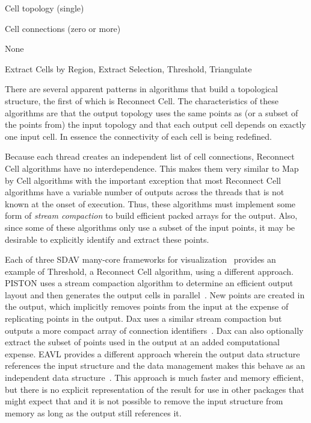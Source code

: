 \documentclass{sig-alternate}
\newcommand*{\lcite}[1]{~\cite{#1}}
\newcommand*{\keyterm}[1]{\emph{#1}}
\newcommand{\algclass}[1]{\textsf{#1}}
\newcommand{\alg}[1]{#1}
\newcommand{\algorithmclasssection}[1]{
  \vspace{\baselineskip}\noindent{\large\textbf{\algclass{#1}}}}
\newcommand{\algorithmclass}[5]{
  \algorithmclasssection{#1} %
  \vspace{-.4\baselineskip}
  \begin{description}[leftmargin=9em,style=nextline,noitemsep]
    \raggedright
  \item[Input] #2
  \item[Output] #3
  \item[Interdependence] #4
  \item[Algorithms] #5
  \end{description}
}
\begin{document}
\algorithmclass{Reconnect Cell}
               {Cell topology (single)} %
               {Cell connections (zero or more)} %
               {None} %
               {Extract Cells by Region, Extract Selection, Threshold,
                 Triangulate}

\noindent
There are several apparent patterns in algorithms that build a topological
structure, the first of which is \algclass{Reconnect Cell}. The
characteristics of these algorithms are that the output topology uses the
same points as (or a subset of the points from) the input topology and that
each output cell depends on exactly one input cell. In essence the
connectivity of each cell is being redefined.

Because each thread creates an independent list of cell connections,
\algclass{Reconnect Cell} algorithms have no interdependence. This makes
them very similar to \algclass{Map by Cell} algorithms with the important
exception that most \algclass{Reconnect Cell} algorithms have a variable
number of outputs across the threads that is not known at the onset of
execution. Thus, these algorithms must implement some form of
\keyterm{stream compaction} to build efficient packed arrays for the
output. Also, since some of these algorithms only use a subset of the input
points, it may be desirable to explicitly identify and extract these
points.

Each of three SDAV many-core frameworks for visualization\lcite{Sewell2012}
provides an example of \alg{Threshold}, a \algclass{Reconnect Cell}
algorithm, using a different approach. PISTON uses a stream compaction
algorithm to determine an efficient output layout and then generates the
output cells in parallel\lcite{PISTON}. New points are created in the
output, which implicitly removes points from the input at the expense of
replicating points in the output. Dax uses a similar stream compaction but
outputs a more compact array of connection
identifiers\lcite{Maynard2013}. Dax can also optionally extract the subset
of points used in the output at an added computational expense. EAVL
provides a different approach wherein the output data structure references
the input structure and the data management makes this behave as an
independent data structure\lcite{Meredith2012}. This approach is much
faster and memory efficient, but there is no explicit representation of the
result for use in other packages that might expect that and it is not
possible to remove the input structure from memory as long as the output
still references it.
\end{document}
